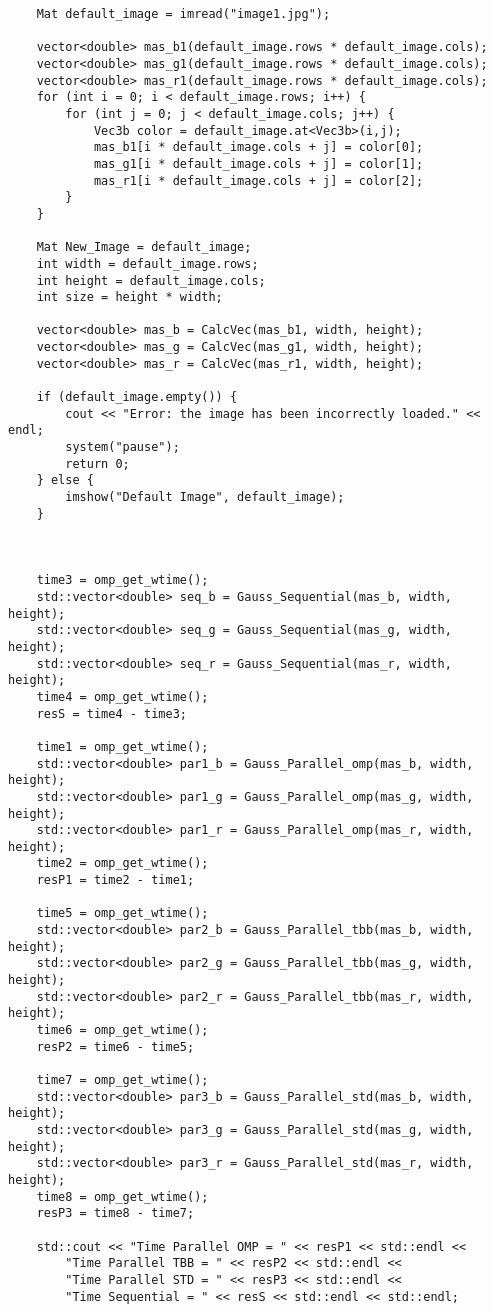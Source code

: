 \documentclass{report}
\begin{document}
\begin{lstlisting}
	Mat default_image = imread("image1.jpg");
	
	vector<double> mas_b1(default_image.rows * default_image.cols);
	vector<double> mas_g1(default_image.rows * default_image.cols);
	vector<double> mas_r1(default_image.rows * default_image.cols);
	for (int i = 0; i < default_image.rows; i++) {
		for (int j = 0; j < default_image.cols; j++) {
			Vec3b color = default_image.at<Vec3b>(i,j);
			mas_b1[i * default_image.cols + j] = color[0];
			mas_g1[i * default_image.cols + j] = color[1];
			mas_r1[i * default_image.cols + j] = color[2];
		}
	}

	Mat New_Image = default_image;
	int width = default_image.rows;
	int height = default_image.cols;
	int size = height * width;

	vector<double> mas_b = CalcVec(mas_b1, width, height);
	vector<double> mas_g = CalcVec(mas_g1, width, height);
	vector<double> mas_r = CalcVec(mas_r1, width, height);

    if (default_image.empty()) {
		cout << "Error: the image has been incorrectly loaded." << endl;
		system("pause");
		return 0;
	} else {
		imshow("Default Image", default_image);
	}

	

	time3 = omp_get_wtime();
	std::vector<double> seq_b = Gauss_Sequential(mas_b, width, height);
	std::vector<double> seq_g = Gauss_Sequential(mas_g, width, height);
	std::vector<double> seq_r = Gauss_Sequential(mas_r, width, height);
	time4 = omp_get_wtime();
	resS = time4 - time3;

	time1 = omp_get_wtime();
	std::vector<double> par1_b = Gauss_Parallel_omp(mas_b, width, height);
	std::vector<double> par1_g = Gauss_Parallel_omp(mas_g, width, height);
	std::vector<double> par1_r = Gauss_Parallel_omp(mas_r, width, height);
	time2 = omp_get_wtime();
	resP1 = time2 - time1;

	time5 = omp_get_wtime();
	std::vector<double> par2_b = Gauss_Parallel_tbb(mas_b, width, height);
	std::vector<double> par2_g = Gauss_Parallel_tbb(mas_g, width, height);
	std::vector<double> par2_r = Gauss_Parallel_tbb(mas_r, width, height);
	time6 = omp_get_wtime();
	resP2 = time6 - time5;

	time7 = omp_get_wtime();
	std::vector<double> par3_b = Gauss_Parallel_std(mas_b, width, height);
	std::vector<double> par3_g = Gauss_Parallel_std(mas_g, width, height);
	std::vector<double> par3_r = Gauss_Parallel_std(mas_r, width, height);
	time8 = omp_get_wtime();
	resP3 = time8 - time7;

	std::cout << "Time Parallel OMP = " << resP1 << std::endl <<
		"Time Parallel TBB = " << resP2 << std::endl <<
		"Time Parallel STD = " << resP3 << std::endl <<
		"Time Sequential = " << resS << std::endl << std::endl;


\end{lstlisting}
\end{document}
